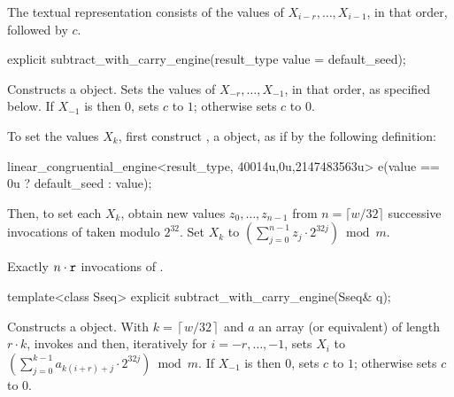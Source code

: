\pnum
The textual representation%
%
consists of the values of
 $X_{i-r}, \ldots, X_{i-1}$,
in that order, followed by $c$.


%
\begin{itemdecl}
explicit subtract_with_carry_engine(result_type value = default_seed);
\end{itemdecl}

\begin{itemdescr}
\pnum\effects Constructs a  object.
 Sets the values of
 $ X_{-r}, \ldots, X_{-1} $,
 in that order, as specified below.
 If $X_{-1}$ is then $0$,
 sets $c$ to $1$;
 otherwise sets $c$ to $0$.

 To set the values $X_k$,
 first construct , a  object,
 as if by the following definition:
\begin{codeblock}
linear_congruential_engine<result_type,
                          40014u,0u,2147483563u> e(value == 0u ? default_seed : value);
\end{codeblock}
 Then, to set each $X_k$,
 obtain new values $ z_0, \ldots, z_{n-1} $
 from $n = \lceil w/32 \rceil $ successive invocations
 of  taken modulo $2^{32}$.
 Set $X_k$ to $ \left( \sum_{j=0}^{n-1} z_j \cdot 2^{32j}\right) \bmod m$.

\pnum\complexity Exactly $n \cdot \texttt{r}$ invocations
 of .
\end{itemdescr}



%
\begin{itemdecl}
template<class Sseq> explicit subtract_with_carry_engine(Sseq& q);
\end{itemdecl}

\begin{itemdescr}
\pnum\effects Constructs a  object.
 With
 $ k = \left\lceil w / 32 \right\rceil $
 and $a$ an array (or equivalent)
 of length $ r \cdot k $,
 invokes 
 and then, iteratively for $i = -r, \ldots, -1$,
 sets $X_i$
 to $ \left(\sum_{j=0}^{k-1}a_{k(i+r)+j} \cdot 2^{32j} \right) \bmod m $.
 If $X_{-1}$ is then $0$,
 sets $c$ to $1$;
 otherwise sets $c$ to $0$.
\end{itemdescr}


